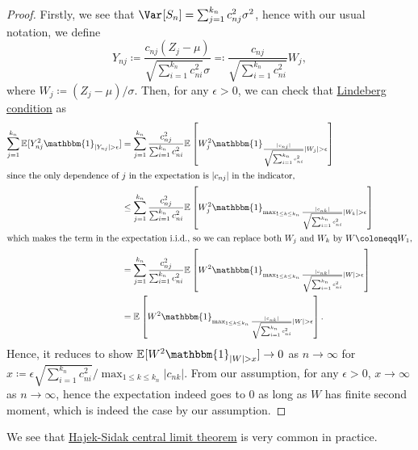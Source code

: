 \begin{proof}
	Firstly, we see that \(\Var_{}[S_n] = \sum_{j=1}^{k_n} c_{nj}^2 \sigma ^2\), hence with our usual notation, we define
	\[
		Y_{nj}
		\coloneqq \frac{c_{nj} (Z_j - \mu )}{\sqrt{\sum_{i=1}^{k_n} c_{ni}^2} \sigma }
		\eqqcolon \frac{c_{nj}}{\sqrt{\sum_{i=1}^{k_n} c_{ni}^2} } W_j,
	\]
	where \(W_j \coloneqq (Z_j - \mu ) / \sigma \). Then, for any \(\epsilon > 0\), we can check that \hyperref[def:Lindeberg-condition]{Lindeberg condition} as
	\begin{align*}
		\sum_{j=1}^{k_n} \mathbb{E}_{}[Y_{nj}^2 \mathbbm{1}_{\vert Y_{nj} \vert > \epsilon } ]
		 & = \sum_{j=1}^{k_n} \frac{c_{nj}^2}{\sum_{i=1}^{k_n} c_{ni}^2} \mathbb{E}_{}\left[ W_j^2 \mathbbm{1}_{\frac{\vert c_{nj} \vert }{\sqrt{\sum_{i=1}^{k_n} c_{ni}^2} } \vert W_j \vert > \epsilon } \right]                               \\
		\shortintertext{since the only dependence of \(j\) in the expectation is \(\vert c_{nj} \vert \) in the indicator,}
		 & \leq \sum_{j=1}^{k_n} \frac{c_{nj}^2}{\sum_{i=1}^{k_n} c_{ni}^2} \mathbb{E}_{}\left[ W_j^2 \mathbbm{1}_{ \max _{1 \leq k \leq k_n} \frac{\vert c_{nk} \vert }{\sqrt{\sum_{i=1}^{k_n} c_{ni}^2} } \vert W_k \vert > \epsilon } \right] \\
		\shortintertext{which makes the term in the expectation i.i.d., so we can replace both \(W_j\) and \(W_k\) by \(W \coloneqq W_1\),}
		 & = \sum_{j=1}^{k_n} \frac{c_{nj}^2}{\sum_{i=1}^{k_n} c_{ni}^2} \mathbb{E}_{}\left[ W^2 \mathbbm{1}_{ \max _{1 \leq k \leq k_n} \frac{\vert c_{nk} \vert }{\sqrt{\sum_{i=1}^{k_n} c_{ni}^2} } \vert W \vert > \epsilon } \right]        \\
		 & = \mathbb{E}_{}\left[ W^2 \mathbbm{1}_{ \max _{1 \leq k \leq k_n} \frac{\vert c_{nk} \vert }{\sqrt{\sum_{i=1}^{k_n} c_{ni}^2} } \vert W \vert > \epsilon } \right] .
	\end{align*}
	Hence, it reduces to show \(\mathbb{E}_{}[ W^2 \mathbbm{1}_{\vert W \vert > x} ] \to 0\) as \(n \to \infty \) for \(x \coloneqq \epsilon \sqrt{\sum_{i=1}^{k_n} c_{ni}^2} / \max _{1 \leq k \leq k_n} \vert c_{nk} \vert \). From our assumption, for any \(\epsilon > 0\), \(x \to \infty \) as \(n \to \infty \), hence the expectation indeed goes to \(0\) as long as \(W\) has finite second moment, which is indeed the case by our assumption.
\end{proof}

We see that \hyperref[thm:Hajek-Sidak-CLT]{Hajek-Sidak central limit theorem} is very common in practice.

